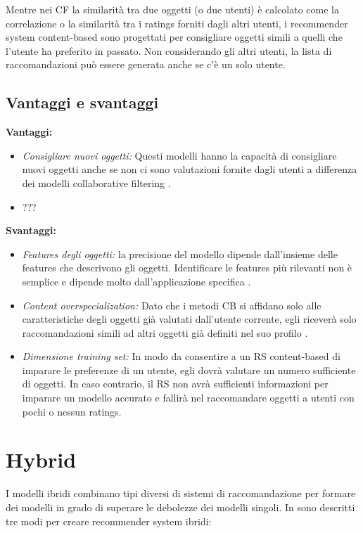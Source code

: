 \documentclass[12pt,italian]{report}
\begin{document}
Mentre nei CF la similarità tra due oggetti (o due utenti) è calcolato come la correlazione o la similarità tra i ratings forniti dagli altri utenti, i recommender system content-based sono progettati per consigliare oggetti simili a quelli che l'utente ha preferito in passato. Non considerando gli altri utenti, la lista di raccomandazioni può essere generata anche se c'è un solo utente.

\subsection{Vantaggi e svantaggi}
\textbf{Vantaggi:}
\begin{itemize}
 \item \textit{Consigliare nuovi oggetti:} Questi modelli hanno la capacità di consigliare nuovi oggetti anche se non ci sono valutazioni fornite dagli utenti a differenza dei modelli collaborative filtering \cite{recsys-principle-methods-evaluation}.

 \item ???
\end{itemize}

\noindent \textbf{Svantaggi:}
\begin{itemize}
 \item \textit{Features degli oggetti:} la precisione del modello dipende dall'insieme delle features che descrivono gli oggetti. Identificare le features più rilevanti non è semplice e dipende molto dall'applicazione specifica \cite{survey-mattia}.
 
 \item \textit{Content overspecialization:} Dato che i metodi CB si affidano solo alle caratteristiche degli oggetti già valutati dall'utente corrente, egli riceverà solo raccomandazioni simili ad altri oggetti già definiti nel suo profilo \cite{recsys-principle-methods-evaluation}.
 
 \item \textit{Dimensione training set:} In modo da consentire a un RS content-based di imparare le preferenze di un utente, egli dovrà valutare un numero sufficiente di oggetti. In caso contrario, il RS non avrà sufficienti informazioni per imparare un modello accurato e fallirà nel raccomandare oggetti a utenti con pochi o nessun ratings.
\end{itemize}

\section{Hybrid}
I modelli ibridi combinano tipi diversi di sistemi di raccomandazione per formare dei modelli in grado di superare le debolezze dei modelli singoli. In \cite{recsys-book} sono descritti tre modi per creare recommender system ibridi:
\end{document}
